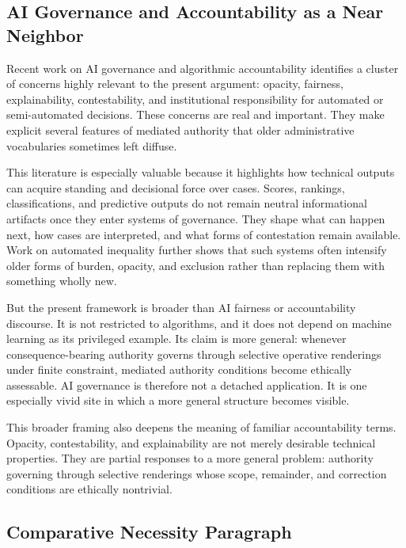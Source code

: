 \documentclass[11pt]{article}
\begin{document}
\subsection{AI Governance and Accountability as a Near Neighbor}

Recent work on AI governance and algorithmic accountability identifies a cluster of concerns highly relevant to the present argument: opacity, fairness, explainability, contestability, and institutional responsibility for automated or semi-automated decisions. These concerns are real and important. They make explicit several features of mediated authority that older administrative vocabularies sometimes left diffuse. \cite{LepriEtAl2018FairTransparentAccountableADM,Tabassi2023NISTAIRMF}

This literature is especially valuable because it highlights how technical outputs can acquire standing and decisional force over cases. Scores, rankings, classifications, and predictive outputs do not remain neutral informational artifacts once they enter systems of governance. They shape what can happen next, how cases are interpreted, and what forms of contestation remain available. Work on automated inequality further shows that such systems often intensify older forms of burden, opacity, and exclusion rather than replacing them with something wholly new. \cite{Eubanks2018AutomatingInequality}

But the present framework is broader than AI fairness or accountability discourse. It is not restricted to algorithms, and it does not depend on machine learning as its privileged example. Its claim is more general: whenever consequence-bearing authority governs through selective operative renderings under finite constraint, mediated authority conditions become ethically assessable. AI governance is therefore not a detached application. It is one especially vivid site in which a more general structure becomes visible.

This broader framing also deepens the meaning of familiar accountability terms. Opacity, contestability, and explainability are not merely desirable technical properties. They are partial responses to a more general problem: authority governing through selective renderings whose scope, remainder, and correction conditions are ethically nontrivial.

\subsection{Comparative Necessity Paragraph}
\end{document}
